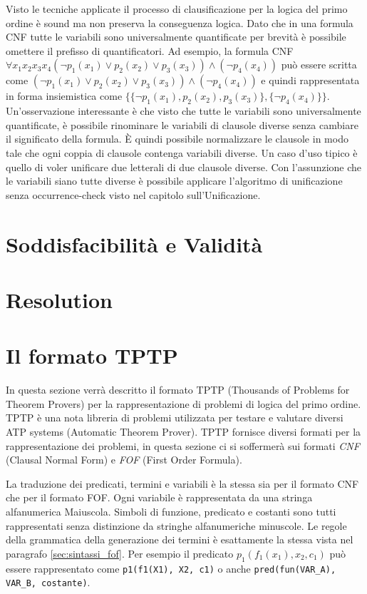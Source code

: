 \documentclass[./main.tex]{subfiles}
\begin{document}
Visto le tecniche applicate il processo di clausificazione per la logica del primo ordine è sound ma non preserva la conseguenza logica.
Dato che in una formula CNF tutte le variabili sono universalmente quantificate per brevità è possibile omettere il prefisso di quantificatori.
Ad esempio, la formula CNF $\forall x_1 x_2 x_3 x_4 (\lnot p_1(x_1) \lor p_2(x_2) \lor p_3(x_3)) \land (\lnot p_4(x_4))$ può essere scritta come
$(\lnot p_1(x_1) \lor p_2(x_2) \lor p_3(x_3)) \land (\lnot p_4(x_4))$ e quindi rappresentata
in forma insiemistica come $\{\{\lnot p_1(x_1), p_2(x_2), p_3(x_3)\}, \{\lnot p_4(x_4)\}\}$.
Un'osservazione interessante è che visto che tutte le variabili sono universalmente quantificate, è possibile rinominare le variabili di clausole diverse senza
cambiare il significato della formula. È quindi possibile normalizzare le clausole in modo tale che ogni coppia di clausole contenga variabili diverse.
Un caso d'uso tipico è quello di voler unificare due letterali di due clausole diverse. Con l'assunzione che le variabili siano tutte diverse è possibile
applicare l'algoritmo di unificazione senza occurrence-check visto nel capitolo sull'Unificazione.



\section{Soddisfacibilità e Validità} \label{sec:sat_val}
\section{Resolution}
\section{Il formato TPTP}
In questa sezione verrà descritto il formato TPTP (Thousands of Problems for Theorem Provers) 
per la rappresentazione di problemi di logica del primo ordine.
TPTP è una nota libreria di problemi utilizzata per testare e valutare diversi ATP systems (Automatic Theorem Prover).
TPTP fornisce diversi formati per la rappresentazione dei problemi,
in questa sezione ci si soffermerà sui formati \textit{CNF} (Clausal Normal Form) e \textit{FOF} (First Order Formula).


La traduzione dei predicati, termini e variabili è la stessa sia per il formato CNF che per il formato FOF.
Ogni variabile è rappresentata da una stringa alfanumerica Maiuscola. 
Simboli di funzione, predicato e costanti sono tutti rappresentati senza distinzione da stringhe alfanumeriche minuscole.
Le regole della grammatica della generazione dei termini è esattamente la stessa vista nel paragrafo \ref{sec:sintassi_fof}.
Per esempio il predicato $p_1(f_1(x_1), x_2, c_1)$ 
può essere rappresentato come \texttt{p1(f1(X1), X2, c1)} o anche \texttt{pred(fun(VAR\_A), VAR\_B, costante)}.
\end{document}
